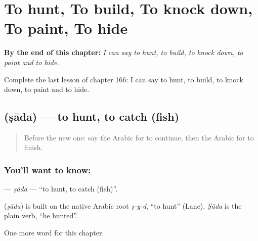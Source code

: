 
\chapter{To hunt, To build, To knock down, To paint, To hide}
\label{ch:ar-to-hunt-to-build-to-knock-down-to-paint-to-hide}

\begin{chapteropening}
\textbf{By the end of this chapter:} \emph{I can say to hunt, to build, to knock down, to paint and to hide.}

Complete the last lesson of chapter 166: I can say to hunt, to build, to knock down, to paint and to hide.
\end{chapteropening}

\section[\texorpdfstring{\ar{صاد} (ṣāda)}{صاد (ṣāda)}]{ (ṣāda) — to hunt, to catch (fish)}

\label{lesson:AR-C166-sada}



\begin{quote}
Before the new one: say the Arabic for to continue, then the Arabic for to finish.
\end{quote}

\subsection*{You'll want to know: }
\textbf{} — \emph{ṣāda} — \textquotedblleft{}to hunt, to catch (fish)\textquotedblright{}.

\begin{cousinweb}
\textbf{} (\emph{ṣāda}) is built on the native Arabic root \emph{ṣ-y-d}, \textquotedblleft{}to hunt\textquotedblright{} (Lane). \emph{Ṣāda} is the plain verb, \textquotedblleft{}he hunted\textquotedblright{}.
\end{cousinweb}

\begin{grammarlens}[title={What you've built}]
One more word for this chapter.
\end{grammarlens}

